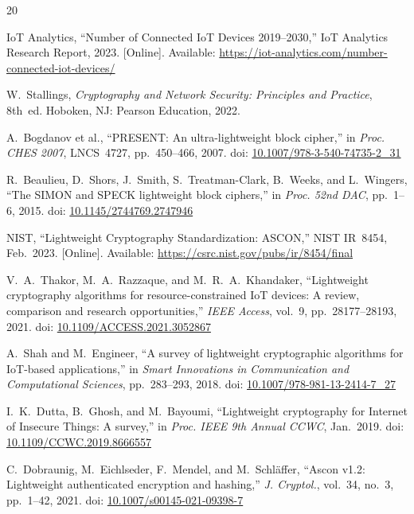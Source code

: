 \documentclass[conference]{IEEEtran}
\begin{document}
\balance
\begin{thebibliography}{20}

IoT Analytics, ``Number of Connected IoT Devices 2019--2030,'' IoT Analytics
Research Report, 2023. [Online]. Available:
\url{https://iot-analytics.com/number-connected-iot-devices/}

W.~Stallings, \textit{Cryptography and Network Security: Principles and
Practice}, 8th~ed. Hoboken, NJ: Pearson Education, 2022.

A.~Bogdanov et al., ``PRESENT: An ultra-lightweight block cipher,'' in
\textit{Proc. CHES 2007}, LNCS~4727, pp.~450--466, 2007.
doi: \href{https://doi.org/10.1007/978-3-540-74735-2_31}{10.1007/978-3-540-74735-2\_31}

R.~Beaulieu, D.~Shors, J.~Smith, S.~Treatman-Clark, B.~Weeks, and
L.~Wingers, ``The SIMON and SPECK lightweight block ciphers,'' in
\textit{Proc. 52nd DAC}, pp.~1--6, 2015.
doi: \href{https://doi.org/10.1145/2744769.2747946}{10.1145/2744769.2747946}

NIST, ``Lightweight Cryptography Standardization: ASCON,'' NIST IR~8454,
Feb.~2023. [Online]. Available:
\url{https://csrc.nist.gov/pubs/ir/8454/final}

V.~A.~Thakor, M.~A.~Razzaque, and M.~R.~A.~Khandaker, ``Lightweight
cryptography algorithms for resource-constrained IoT devices: A review,
comparison and research opportunities,'' \textit{IEEE Access}, vol.~9,
pp.~28177--28193, 2021.
doi: \href{https://doi.org/10.1109/ACCESS.2021.3052867}{10.1109/ACCESS.2021.3052867}

A.~Shah and M.~Engineer, ``A survey of lightweight cryptographic algorithms
for IoT-based applications,'' in \textit{Smart Innovations in Communication
and Computational Sciences}, pp.~283--293, 2018.
doi: \href{https://doi.org/10.1007/978-981-13-2414-7_27}{10.1007/978-981-13-2414-7\_27}

I.~K.~Dutta, B.~Ghosh, and M.~Bayoumi, ``Lightweight cryptography for
Internet of Insecure Things: A survey,'' in \textit{Proc. IEEE 9th Annual
CCWC}, Jan.~2019.
doi: \href{https://doi.org/10.1109/CCWC.2019.8666557}{10.1109/CCWC.2019.8666557}

C.~Dobraunig, M.~Eichlseder, F.~Mendel, and M.~Schl{\"a}ffer, ``Ascon v1.2:
Lightweight authenticated encryption and hashing,'' \textit{J. Cryptol.},
vol.~34, no.~3, pp.~1--42, 2021.
doi: \href{https://doi.org/10.1007/s00145-021-09398-7}{10.1007/s00145-021-09398-7}


\end{thebibliography}
\end{document}
